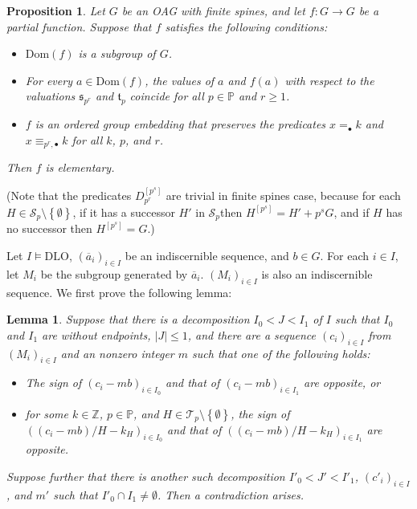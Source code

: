 \documentclass{article}
\theoremstyle{definition}
\theoremstyle{remark}
\theoremstyle{plain}
\newtheorem*{prop*}{Proposition}
\newtheorem*{lem*}{Lemma}
\begin{document}
\begin{prop*}
	Let $G$ be an OAG with finite spines, and let $f: G \to G$ be a partial function.
	Suppose that $f$ satisfies the following conditions:
	\begin{itemize}
		\item $\mathrm{Dom}(f)$ is a subgroup of $G$.
		\item For every $a \in \mathrm{Dom}(f)$, the values of $a$ and $f(a)$ with respect to the valuations $\mathfrak{s}_{p^r}$ and $\mathfrak{t}_p$ coincide for all $p \in \mathbb{P}$ and $r \geq 1$.
		\item $f$ is an ordered group embedding that preserves the predicates $x =_{\bullet} k$ and $x \equiv_{p^r, \bullet} k$ for all $k$, $p$, and $r$.
	\end{itemize}
	Then $f$ is elementary.
\end{prop*}

(Note that the predicates $D_{p^r}^{[p^s]}$ are trivial in finite spines case, because for each $H \in \mathcal{S}_p \setminus \left\{ \emptyset \right\}$, if it has a successor $H'$ in $\mathcal{S}_p$then $H^{[p^s]} = H' + p^s G$, and if $H$ has no successor then $H^{[p^s]} = G$.)

Let $I \models \mathrm{DLO}$, $(\overline{a}_i)_{i \in I}$ be an indiscernible sequence, and $b \in G$.
For each $i \in I$, let $M_i$ be the subgroup generated by $\overline{a}_i$.
$(M_i)_{i \in I}$ is also an indiscernible sequence.
We first prove the following lemma:

\begin{lem*}
	Suppose that there is a decomposition $I_0 < J < I_1$ of $I$ such that $I_0$ and $I_1$ are without endpoints, $|J| \leq 1$, and there are a sequence $(c_i)_{i \in I}$ from $(M_i)_{i \in I}$ and an nonzero integer $m$ such that one of the following holds:
	\begin{itemize}
		\item The sign of $(c_i - mb)_{i \in I_0}$ and that of $(c_i - mb)_{i \in I_1}$ are opposite, or
		\item for some $k \in \mathbb{Z}$, $p \in \mathbb{P}$, and $H \in \mathcal{T}_p \setminus \left\{ \emptyset \right\}$, the sign of $((c_i - mb) / H - k_H)_{i \in I_0}$ and that of $((c_i - mb) / H - k_H)_{i \in I_1}$ are opposite.
	\end{itemize}
	Suppose further that there is another such decomposition $I'_0 < J' < I'_1$, $(c'_i)_{i \in I}$, and $m'$ such that $I'_0 \cap I_1 \neq \emptyset$.
	Then a contradiction arises.
\end{lem*}
\end{document}
